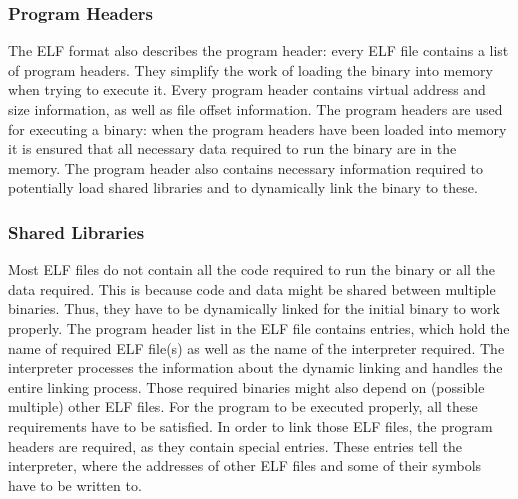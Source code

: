 	\subsubsection{Program Headers}
	The ELF format also describes the program header: every ELF file contains a list of program headers. They simplify the work of loading the binary into memory when trying to execute it. Every program header contains virtual address and size information, as well as file offset information. The program headers are used for executing a binary: when the program headers have been loaded into memory it is ensured that all necessary data required to run the binary are in the memory. The program header also contains necessary information required to potentially load shared libraries and to dynamically link the binary to these. 
	
	\subsubsection{Shared Libraries}
	Most ELF files do not contain all the code required to run the binary or all the data required. This is because code and data might be shared between multiple binaries. Thus, they have to be dynamically linked for the initial binary to work properly. The program header list in the ELF file contains entries, which hold the name of required ELF file(s) as well as the name of the interpreter required. The interpreter processes the information about the dynamic linking and handles the entire linking process. Those required binaries might also depend on (possible multiple) other ELF files. For the program to be executed properly, all these requirements have to be satisfied. In order to link those ELF files, the program headers are required, as they contain special entries. These entries tell the interpreter, where the addresses of other ELF files and some of their symbols have to be written to.
